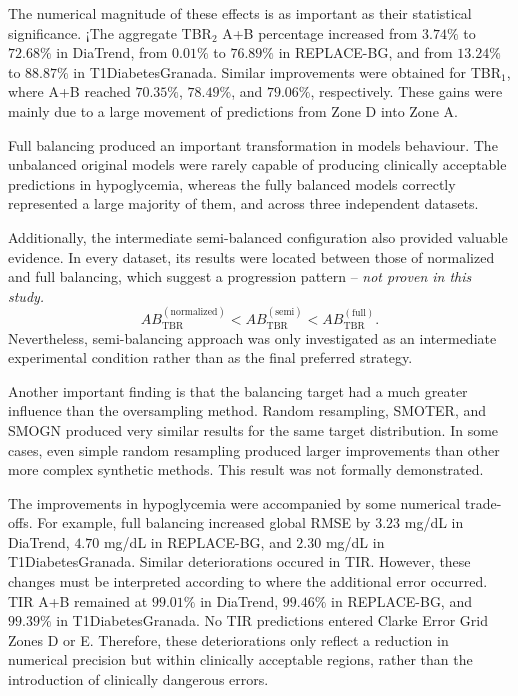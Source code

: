 The numerical magnitude of these effects is as important as their statistical significance. ¡The aggregate TBR$_2$ A+B percentage increased from \(3.74\%\) to \(72.68\%\) in DiaTrend, from \(0.01\%\) to \(76.89\%\) in REPLACE-BG, and from \(13.24\%\) to \(88.87\%\) in T1DiabetesGranada. Similar improvements were obtained for TBR$_1$, where A+B reached \(70.35\%\), \(78.49\%\), and \(79.06\%\), respectively. These gains were mainly due to a large movement of predictions from Zone D into Zone A.

Full balancing produced an important transformation in models behaviour. The unbalanced original models were rarely capable of producing clinically acceptable predictions in hypoglycemia, whereas the fully balanced models correctly represented a large majority of them, and across three independent datasets.
    
Additionally, the intermediate semi-balanced configuration also provided valuable evidence. In every dataset, its results were located between those of normalized and full balancing, which suggest a progression pattern -- \textit{not proven in this study.}
    \begin{equation}
    AB_{\mathrm{TBR}}^{(\mathrm{normalized})}
    <
    AB_{\mathrm{TBR}}^{(\mathrm{semi})}
    <
    AB_{\mathrm{TBR}}^{(\mathrm{full})}.
    \end{equation}
Nevertheless, semi-balancing approach was only investigated as an intermediate experimental condition rather than as the final preferred strategy.

Another important finding is that the balancing target had a much greater influence than the oversampling method. Random resampling, SMOTER, and SMOGN produced very similar results for the same target distribution. In some cases, even simple random resampling produced larger improvements than other more complex synthetic methods. This result was not formally demonstrated.
    
The improvements in hypoglycemia were accompanied by some numerical trade-offs. For example, full balancing increased global RMSE by \(3.23\) mg/dL in DiaTrend, \(4.70\) mg/dL in REPLACE-BG, and \(2.30\) mg/dL in T1DiabetesGranada. Similar deteriorations occured in TIR. However, these changes must be interpreted according to where the additional error occurred. TIR A+B remained at \(99.01\%\) in DiaTrend, \(99.46\%\) in REPLACE-BG, and \(99.39\%\) in T1DiabetesGranada. No TIR predictions entered Clarke Error Grid Zones D or E. Therefore, these deteriorations only reflect a reduction in numerical precision but within clinically acceptable regions, rather than the introduction of clinically dangerous errors.
    

